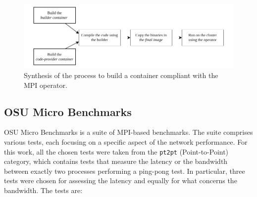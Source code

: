\begin{figure}
  \centering
  \includegraphics[width=\textwidth]{img/chpt3/mpi-container-building}
  \caption{Synthesis of the process to build a container compliant with the MPI
    operator.}
  \label{fig:mpi-container-creation}
\end{figure}


\subsection{OSU Micro Benchmarks}

OSU Micro Benchmarks\cite{osu} is a suite of MPI-based benchmarks. The suite
comprises various tests, each focusing on a specific aspect of the network
performance. For this work, all the chosen tests were taken from the
\texttt{pt2pt} (Point-to-Point) category, which contains tests that measure the
latency or the bandwidth between exactly two processes performing a ping-pong
test. In particular, three tests were chosen for assessing the latency and
equally for what concerns the bandwidth. The tests are:

